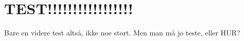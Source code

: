 \section{TEST!!!!!!!!!!!!!!!!!}

Bare en videre test altså, ikke noe stort. Men man må jo teste, eller HUR? 